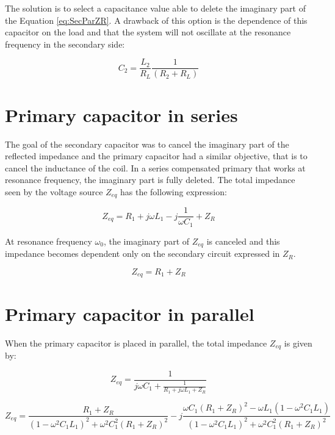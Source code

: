 The solution is to select a capacitance value able to delete the imaginary part of the Equation \ref{eq:SecParZR}. A drawback of this option is the dependence of this capacitor on the load and that the system will not oscillate at the resonance frequency in the secondary side:

\begin{equation} \label{Eq:differentCapacitor}
C_2 = \frac{L_2}{R_L}\frac{1}{(R_2+R_L)}
\end{equation}

\section{Primary capacitor in series}\label{sec:primaryS}

The goal of the secondary capacitor was to cancel the imaginary part of the reflected impedance and the primary capacitor had a similar objective, that is to cancel the inductance of the coil. In a series compensated primary that works at resonance frequency, the imaginary part is fully deleted. The total impedance seen by the voltage source $Z_{eq}$ has the following expression:

\begin{equation}
Z_{eq} = R_1+j\omega{L_1}-j\frac{1}{\omega{C_1}}+Z_R
\end{equation}

At resonance frequency $\omega_0$, the imaginary part of $Z_{eq}$ is canceled and this impedance becomes dependent only on the secondary circuit expressed in $Z_R$.

\begin{equation}
Z_{eq} = R_1+Z_R
\end{equation}

\section{Primary capacitor in parallel}\label{sec:primaryP}

When the primary capacitor is placed in parallel, the total impedance $Z_{eq}$ is given by:

\begin{equation*}
Z_{eq} = \frac{1}{j\omega{C_1}+\frac{1}{R_1+j\omega{L_1}+Z_R}} 
\end{equation*}

\begin{equation} \label{eq:PriParZeq}
Z_{eq} = \frac{R_1+Z_R}{(1-\omega^2C_1L_1)^2+\omega^2C_1^2(R_1+Z_R)^2}-j\frac{\omega{C_1}(R_1+Z_R)^2-\omega{L_1}(1-\omega^2C_1L_1)}{(1-\omega^2C_1L_1)^2+\omega^2C_1^2(R_1+Z_R)^2}
\end{equation}


